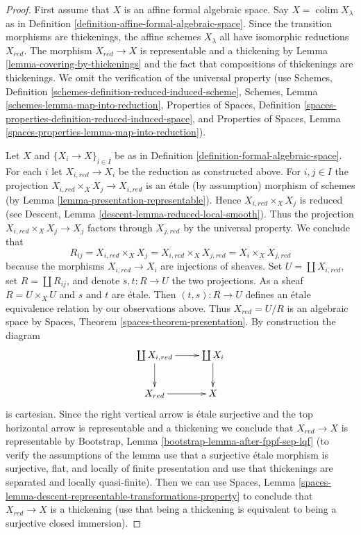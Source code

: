 \documentclass{stacks-project}
\theoremstyle{plain}
\theoremstyle{definition}
\theoremstyle{remark}
\numberwithin{equation}{subsection}
\def\colim{\mathop{\mathrm{colim}}\nolimits}
\begin{document}
\begin{proof}
First assume that $X$ is an affine formal algebraic space.
Say $X = \colim X_\lambda$ as in
Definition \ref{definition-affine-formal-algebraic-space}.
Since the transition morphisms are thickenings, the affine
schemes $X_\lambda$ all have isomorphic reductions $X_{red}$.
The morphism $X_{red} \to X$ is representable and a thickening
by Lemma \ref{lemma-covering-by-thickenings} and the fact that
compositions of thickenings are thickenings. We omit the
verification of the universal
property (use Schemes, Definition
\ref{schemes-definition-reduced-induced-scheme},
Schemes, Lemma \ref{schemes-lemma-map-into-reduction},
Properties of Spaces, Definition
\ref{spaces-properties-definition-reduced-induced-space}, and
Properties of Spaces, Lemma \ref{spaces-properties-lemma-map-into-reduction}).

\medskip\noindent
Let $X$ and $\{X_i \to X\}_{i \in I}$ be as in
Definition \ref{definition-formal-algebraic-space}.
For each $i$ let $X_{i, red} \to X_i$ be the reduction as
constructed above. For $i, j \in I$ the projection
$X_{i, red} \times_X X_j \to X_{i, red}$ is an \'etale (by assumption)
morphism of schemes (by Lemma \ref{lemma-presentation-representable}).
Hence $X_{i, red} \times_X X_j$ is reduced (see
Descent, Lemma \ref{descent-lemma-reduced-local-smooth}).
Thus the projection $X_{i, red} \times_X X_j \to X_j$ factors
through $X_{j, red}$ by the universal property. We conclude that
$$
R_{ij} = X_{i, red} \times_X X_j = X_{i, red} \times_X X_{j, red} =
X_i \times_X X_{j, red}
$$
because the morphisms $X_{i, red} \to X_i$ are injections of sheaves.
Set $U = \coprod X_{i, red}$, set
$R = \coprod R_{ij}$, and denote $s, t : R \to U$ the two
projections. As a sheaf $R = U \times_X U$ and $s$ and $t$
are \'etale. Then $(t, s) : R \to U$ defines an \'etale equivalence
relation by our observations above. Thus $X_{red} = U/R$ is an
algebraic space by Spaces, Theorem \ref{spaces-theorem-presentation}.
By construction the diagram
$$
\xymatrix{
\coprod X_{i, red} \ar[r] \ar[d] & \coprod X_i \ar[d] \\
X_{red} \ar[r] & X
}
$$
is cartesian. Since the right vertical arrow is \'etale surjective
and the top horizontal arrow is representable and a thickening
we conclude that $X_{red} \to X$ is representable by
Bootstrap, Lemma \ref{bootstrap-lemma-after-fppf-sep-lqf}
(to verify the assumptions of the lemma use that a surjective
\'etale morphism is surjective, flat, and locally of finite
presentation and use that thickenings are separated and locally quasi-finite).
Then we can use Spaces, Lemma
\ref{spaces-lemma-descent-representable-transformations-property}
to conclude that $X_{red} \to X$ is a thickening
(use that being a thickening is equivalent to being
a surjective closed immersion).


\end{proof}
\end{document}
